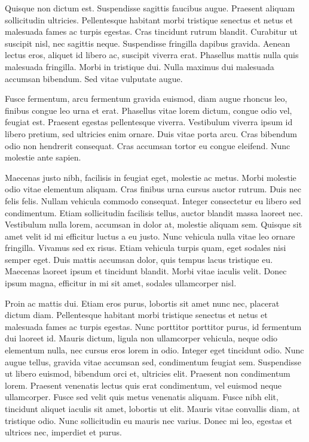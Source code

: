 \documentclass[12pt, letterpaper,twocolumn]{article}
\begin{document}
Quisque non dictum est. Suspendisse sagittis faucibus augue. Praesent aliquam sollicitudin ultricies. Pellentesque habitant morbi tristique senectus et netus et malesuada fames ac turpis egestas. Cras tincidunt rutrum blandit. Curabitur ut suscipit nisl, nec sagittis neque. Suspendisse fringilla dapibus gravida. Aenean lectus eros, aliquet id libero ac, suscipit viverra erat. Phasellus mattis nulla quis malesuada fringilla. Morbi in tristique dui. Nulla maximus dui malesuada accumsan bibendum. Sed vitae vulputate augue.

Fusce fermentum, arcu fermentum gravida euismod, diam augue rhoncus leo, finibus congue leo urna et erat. Phasellus vitae lorem dictum, congue odio vel, feugiat est. Praesent egestas pellentesque viverra. Vestibulum viverra ipsum id libero pretium, sed ultricies enim ornare. Duis vitae porta arcu. Cras bibendum odio non hendrerit consequat. Cras accumsan tortor eu congue eleifend. Nunc molestie ante sapien.

Maecenas justo nibh, facilisis in feugiat eget, molestie ac metus. Morbi molestie odio vitae elementum aliquam. Cras finibus urna cursus auctor rutrum. Duis nec felis felis. Nullam vehicula commodo consequat. Integer consectetur eu libero sed condimentum. Etiam sollicitudin facilisis tellus, auctor blandit massa laoreet nec. Vestibulum nulla lorem, accumsan in dolor at, molestie aliquam sem. Quisque sit amet velit id mi efficitur luctus a eu justo. Nunc vehicula nulla vitae leo ornare fringilla. Vivamus sed ex risus. Etiam vehicula turpis quam, eget sodales nisi semper eget. Duis mattis accumsan dolor, quis tempus lacus tristique eu. Maecenas laoreet ipsum et tincidunt blandit. Morbi vitae iaculis velit. Donec ipsum magna, efficitur in mi sit amet, sodales ullamcorper nisl.

Proin ac mattis dui. Etiam eros purus, lobortis sit amet nunc nec, placerat dictum diam. Pellentesque habitant morbi tristique senectus et netus et malesuada fames ac turpis egestas. Nunc porttitor porttitor purus, id fermentum dui laoreet id. Mauris dictum, ligula non ullamcorper vehicula, neque odio elementum nulla, nec cursus eros lorem in odio. Integer eget tincidunt odio. Nunc augue tellus, gravida vitae accumsan sed, condimentum feugiat sem. Suspendisse ut libero euismod, bibendum orci et, ultricies elit. Praesent non condimentum lorem. Praesent venenatis lectus quis erat condimentum, vel euismod neque ullamcorper. Fusce sed velit quis metus venenatis aliquam. Fusce nibh elit, tincidunt aliquet iaculis sit amet, lobortis ut elit. Mauris vitae convallis diam, at tristique odio. Nunc sollicitudin eu mauris nec varius. Donec mi leo, egestas et ultrices nec, imperdiet et purus.
\end{document}
